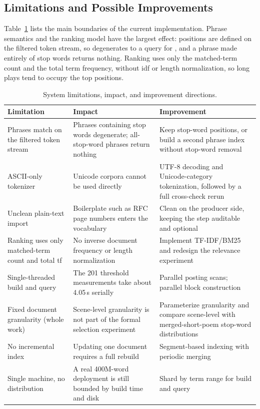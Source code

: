 \subsection{Limitations and Possible Improvements}
\label{sec:threshold-semantics}

Table~\ref{tab:limits} lists the main boundaries of the current implementation.
Phrase semantics and the ranking model have the largest effect: positions are
defined on the filtered token stream, so  degenerates to a query
for , and a phrase made entirely of stop words returns nothing.
Ranking uses only the matched-term count and the total term frequency, without
idf or length normalization, so long plays tend to occupy the top positions.

\begin{table}[!htbp]
  \centering
  \caption{System limitations, impact, and improvement directions.}
  \label{tab:limits}
  \footnotesize
  \begin{tabularx}{\linewidth}{l X X}
    \toprule
    Limitation & Impact & Improvement \\
    \midrule
    Phrases match on the filtered token stream &
      Phrases containing stop words degenerate; all-stop-word phrases return
      nothing &
      Keep stop-word positions, or build a second phrase index without stop-word
      removal \\
    ASCII-only tokenizer & Unicode corpora cannot be used directly &
      UTF-8 decoding and Unicode-category tokenization, followed by a full
      cross-check rerun \\
    Unclean plain-text import & Boilerplate such as RFC page numbers enters the
      vocabulary &
      Clean on the producer side, keeping the step auditable and optional \\
    Ranking uses only matched-term count and total tf & No inverse document
      frequency or length normalization &
      Implement TF-IDF/BM25 and redesign the relevance experiment \\
    Single-threaded build and query & The 201 threshold measurements take about
      4.05\,s serially &
      Parallel posting scans; parallel block construction \\
    Fixed document granularity (whole work) & Scene-level granularity is not
      part of the formal selection experiment &
      Parameterize granularity and compare scene-level with merged-short-poem
      stop-word distributions \\
    No incremental index & Updating one document requires a full rebuild &
      Segment-based indexing with periodic merging \\
    Single machine, no distribution & A real 400M-word deployment is still
      bounded by build time and disk &
      Shard by term range for build and query \\
    \bottomrule
  \end{tabularx}
\end{table}

